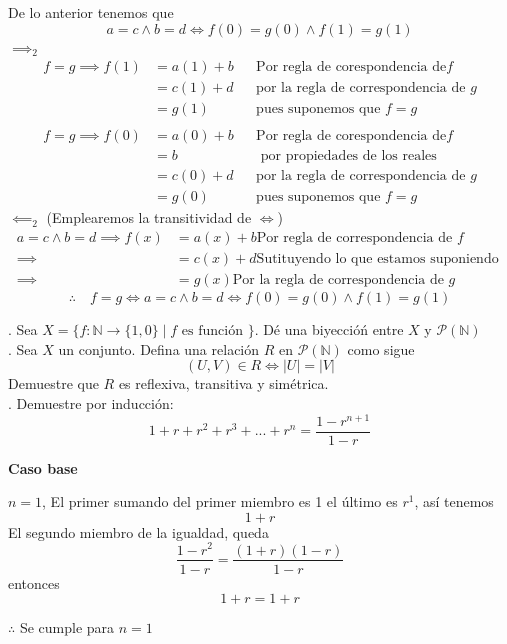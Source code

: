 \documentclass[letterpaper]{article}
\providecommand{\abs}[1]{\left|#1\right|}
\newcommand{\N}{\mathds{N}}
\renewcommand{\P}{\mathcal{P}}
\renewcommand{\*}{\cdot}
\theoremstyle{definition}
\begin{document}
De lo anterior tenemos que 
\[ a = c \land b = d \iff f(0) = g(0) \land f(1) = g(1) \]
$ \implies_2 $
\begin{align*}
	f = g \implies f (1) &= a(1) + b &&\text{Por regla de corespondencia de} f \\
	 &= c(1) + d &&\text{por la regla de correspondencia de }g \\
	 &= g(1) &&\text{pues suponemos que } f = g \\ \\
	f = g \implies f (0) &= a(0) + b &&\text{Por regla de corespondencia de} f \\
	 &= b &&\text{ por propiedades de los reales} \\
	 &= c (0) + d &&\text{por la regla de correspondencia de }g \\
	 &= g(0) &&\text{pues suponemos que } f = g 
\end{align*}
$ \impliedby_2 $ (Emplearemos la transitividad de $ \iff $)
\begin{align*}
	a = c \land b = d \implies f(x) &= a(x) + b \text{Por regla de correspondencia de } f\\
	\implies &= c(x) + d \text{Sutituyendo lo que estamos suponiendo }\\
	\implies &= g(x) \text{Por la regla de correspondencia de } g
\end{align*}
$$ \therefore \quad f = g \iff a = c \land b = d \iff f(0) = g(0) \land f(1) = g(1)  $$


. Sea $ X = \{ f: \N \to \{1,0\} \mid f \text{ es función } \}  $. Dé una biyeccióń entre $ X $ y $ \P(\N) $\\


. Sea $ X $ un conjunto. Defina una relación $ R $ en $ \P(\N) $ como sigue
\[ (U,V) \in R \iff \abs{U} = \abs{V} \]
Demuestre que $ R $ es reflexiva, transitiva y simétrica.\\


. Demuestre por inducción:
$$1+r+r^2+r^3+...+r^n=\frac{1-r^{n+1}}{1-r}$$
\begin{flushright}
	\textbf{Caso base} 
\end{flushright}
$ n=1 $, El primer sumando del primer miembro es 1 el último es $r^1$, así tenemos\\
$$1+r$$ 
El segundo miembro de la igualdad, queda $$\frac{1-r^2}{1-r}=\frac{(1+r)(1-r)}{1-r}$$
entonces $$1+r=1+r$$ 
\begin{center}
	$ \therefore $  Se cumple para $n=1$
\end{center}
\end{document}
